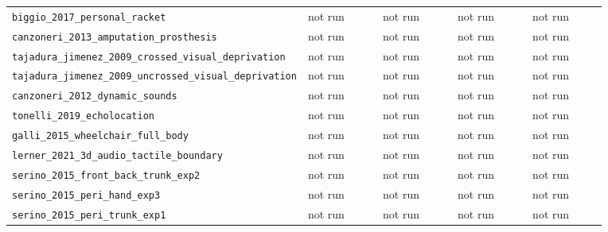 \documentclass[11pt]{article}
\begin{document}
{\begin{longtable}{>{\raggedright\arraybackslash}p{0.35\linewidth}p{0.13\linewidth}p{0.13\linewidth}p{0.13\linewidth}p{0.13\linewidth}}
\texttt{biggio\_\allowbreak{}2017\_\allowbreak{}personal\_\allowbreak{}racket} & not run & not run & not run & not run \\
\texttt{canzoneri\_\allowbreak{}2013\_\allowbreak{}amputation\_\allowbreak{}prosthesis} & not run & not run & not run & not run \\
\texttt{tajadura\_\allowbreak{}jimenez\_\allowbreak{}2009\_\allowbreak{}crossed\_\allowbreak{}visual\_\allowbreak{}deprivation} & not run & not run & not run & not run \\
\texttt{tajadura\_\allowbreak{}jimenez\_\allowbreak{}2009\_\allowbreak{}uncrossed\_\allowbreak{}visual\_\allowbreak{}deprivation} & not run & not run & not run & not run \\
\texttt{canzoneri\_\allowbreak{}2012\_\allowbreak{}dynamic\_\allowbreak{}sounds} & not run & not run & not run & not run \\
\texttt{tonelli\_\allowbreak{}2019\_\allowbreak{}echolocation} & not run & not run & not run & not run \\
\texttt{galli\_\allowbreak{}2015\_\allowbreak{}wheelchair\_\allowbreak{}full\_\allowbreak{}body} & not run & not run & not run & not run \\
\texttt{lerner\_\allowbreak{}2021\_\allowbreak{}3d\_\allowbreak{}audio\_\allowbreak{}tactile\_\allowbreak{}boundary} & not run & not run & not run & not run \\
\texttt{serino\_\allowbreak{}2015\_\allowbreak{}front\_\allowbreak{}back\_\allowbreak{}trunk\_\allowbreak{}exp2} & not run & not run & not run & not run \\
\texttt{serino\_\allowbreak{}2015\_\allowbreak{}peri\_\allowbreak{}hand\_\allowbreak{}exp3} & not run & not run & not run & not run \\
\texttt{serino\_\allowbreak{}2015\_\allowbreak{}peri\_\allowbreak{}trunk\_\allowbreak{}exp1} & not run & not run & not run & not run \\
\bottomrule
\end{longtable}
}
\end{document}
